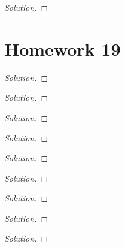 \begin{problem}
\end{problem}
\begin{proof}[Solution]
\end{proof}


\section{Homework 19}
\begin{problem}
\end{problem}
\begin{proof}[Solution]
\end{proof}

\begin{problem}
\end{problem}
\begin{proof}[Solution]
\end{proof}

\begin{problem}
\end{problem}
\begin{proof}[Solution]
\end{proof}

\begin{problem}
\end{problem}
\begin{proof}[Solution]
\end{proof}

\begin{problem}
\end{problem}
\begin{proof}[Solution]
\end{proof}

\begin{problem}
\end{problem}
\begin{proof}[Solution]
\end{proof}

\begin{problem}
\end{problem}
\begin{proof}[Solution]
\end{proof}

\begin{problem}
\end{problem}
\begin{proof}[Solution]
\end{proof}

\begin{problem}
\end{problem}
\begin{proof}[Solution]
\end{proof}

